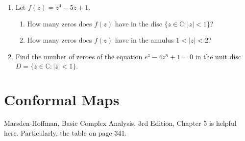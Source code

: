 \documentclass[a4paper,10pt]{article}
\begin{document}
\begin{enumerate}
	\item Let $f(z)=z^{4}-5z+1$.
	\begin{enumerate}
		\item How many zeros does $f(z)$ have in the disc $\{z\in \mathbb{C}:|z|<1\}$?
		\item How many zeros does $f(z)$ have in the annulus $1<|z|<2$?
	\end{enumerate}
	
	\item Find the number of zeroes of the equation $e^{z}-4z^{n}+1=0$ in the unit disc $D=\{z\in \mathbb{C}:|z|<1\}$.
	
\end{enumerate}

\newpage
\section{Conformal Maps}
Marsden-Hoffman, Basic Complex Analysis, 3rd Edition, Chapter 5 is helpful here. 
Particularly, the table on page 341.
\end{document}
